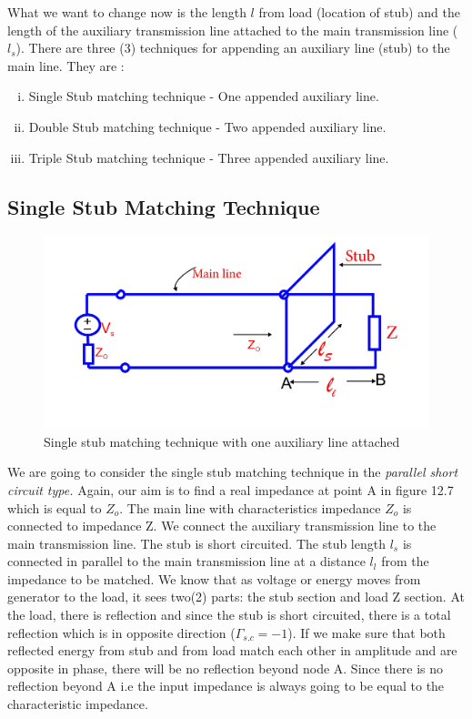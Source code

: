 What we want to change now is the length $l$ from load (location of stub) and the length of the auxiliary transmission line attached to the main transmission line ($l_s$). There are three (3) techniques for appending an auxiliary line (stub) to the main line. They are :
\begin{enumerate}[(i)]
\item Single Stub matching technique - One appended auxiliary line.
\item Double Stub matching technique - Two appended auxiliary line.
\item Triple Stub matching technique - Three appended auxiliary line.  
\end{enumerate} 
\subsection{Single Stub Matching Technique }
\begin{figure}[h]
\centering
\includegraphics[width=1\linewidth]{./graphics/fig11}
\caption{Single stub matching technique with one auxiliary line attached}
\end{figure}

We are going to consider the single stub matching technique in the\textit{ parallel short circuit type.} Again, our aim is to find a real impedance at point A in figure 12.7 which is equal to $Z_o$. The main line with characteristics impedance $ Z_o$ is connected to impedance Z. We connect the auxiliary transmission line to the main transmission line. The stub is short circuited. The stub length $l_s$ is connected in parallel to the main transmission line at a distance $ l_l$ from the impedance to be matched. We know that as voltage or energy moves from generator to the load, it sees two(2) parts: the stub section and load Z section. At the load, there is  reflection and since the stub is short circuited, there is a total reflection which is in opposite direction ($\Gamma_{s.c} = -1$). If we make sure that both reflected energy from stub and  from load match each other in amplitude and are opposite in phase, there will be no reflection beyond node A. Since there is no reflection beyond A i.e the input impedance is always going to be equal to the characteristic impedance.\\

